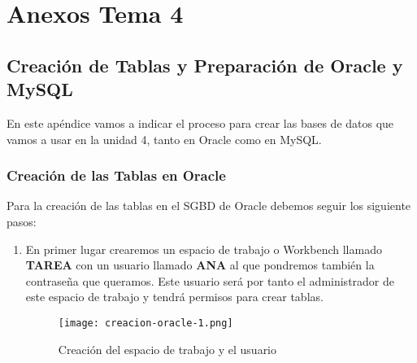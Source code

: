 \chapter{Anexos Tema 4}

\section{Creación de Tablas y Preparación de Oracle y MySQL}
En este apéndice vamos a indicar el proceso para crear las bases de datos que vamos a usar en la unidad 4, tanto en Oracle como en MySQL.

\subsection{Creación de las Tablas en Oracle}
Para la creación de las tablas en el SGBD de Oracle debemos seguir los siguiente pasos:

\begin{enumerate}
    \item En primer lugar crearemos un espacio de trabajo o Workbench llamado \textbf{TAREA} con un usuario llamado \textbf{ANA} al que pondremos también la contraseña que queramos. Este usuario será por tanto el administrador de este espacio de trabajo y tendrá permisos para crear tablas.

    \begin{figure}[H]
        \centering
        \texttt{[image: creacion-oracle-1.png]}
        \caption{Creación del espacio de trabajo y el usuario}
    \end{figure}
\end{enumerate}


\glsaddall
\printglossaries


\newpage
{}



